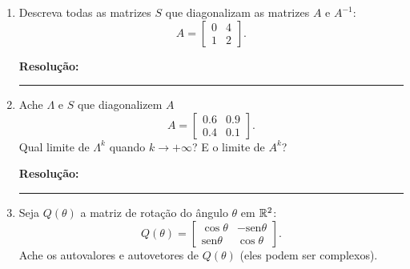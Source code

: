 \documentclass[leqno]{article}
\numberwithin{equation}{section}
\newenvironment{sol} 
{
    \vspace{4mm}
    \noindent\textbf{Resolução:}
    \strut\newline
    \smallskip
    \hspace{-3.5mm} 
} 
{\noindent\rule{4cm}{.1mm}}
\begin{document}
\begin{enumerate}
\begin{enumerate*}
\end{enumerate*}

\begin{sol}

    
\end{sol}


\item Descreva todas as matrizes $S$ que diagonalizam as matrizes $A$ e $A^{-1}$:
$$A = \begin{bmatrix}
0 & 4 \\
1 & 2 
\end{bmatrix}.$$

\begin{sol}

    
\end{sol}


\item Ache $\Lambda$ e $S$ que diagonalizem $A$
$$A = \begin{bmatrix}
0.6 & 0.9 \\
0.4 & 0.1
\end{bmatrix}.$$
Qual limite de $\Lambda^k$ quando $k \to +\infty$? E o limite de $A^k$?

\begin{sol}

    
\end{sol}


\item Seja $Q(\theta)$ a matriz de rotação do ângulo $\theta$ em $\mathbb{R}^2$:
$$Q(\theta) = \begin{bmatrix}
\cos \theta & -\mbox{sen} \theta \\
\mbox{sen} \theta & \cos \theta
\end{bmatrix}.$$
Ache os autovalores e autovetores de $Q(\theta)$ (eles podem ser complexos).


\end{enumerate}
\end{document}
